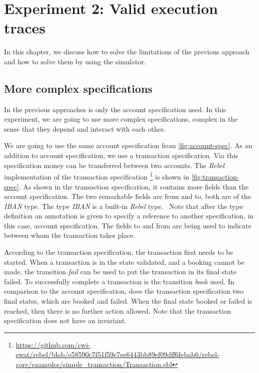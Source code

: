 \chapter{Experiment 2: Valid execution traces}\label{sec:ch5}

In this chapter, we discuss how to solve the limitations of the previous
approach and how to solve them by using the simulator.

\section{More complex specifications}\label{sec:ch5-complex-spec}
In the previous approaches is only the account specification used. In this
experiment, we are going to use more complex specifications, complex in the
sense that they depend and interact with each other.

We are going to use the
same account specification from \autoref{fig:account-spec}. As an addition to
account specification, we use a transaction specification. Via this
specification money can be transferred between two accounts.
The \textit{Rebel} implementation of the transaction specification \footnote{\url{https://github.com/cwi-swat/rebel/blob/e58590c7f51f59e7ee6443bb89ef09dff6febab6/rebel-core/examples/simple_transaction/Transaction.ebl}} is shown in \autoref{fig:transaction-spec}.
As shown in the transaction specification, it contains more fields than the
account specification. The two remarkable fields are from and to, both are of
the \textit{IBAN} type. The type \textit{IBAN} is a built-in \textit{Rebel}
type.~\cite[p.~3]{stoel_storm_vinju_bosman_2016} Note that after the type
definition an annotation is given to specify a reference to another
specification, in this case, account specification. The fields to and from are
being used to indicate between whom the transaction takes place.

According to the transaction specification, the transaction first
needs to be started. When a transaction is in the state validated, and a booking
cannot be made, the transition \textit{fail} can be used to put the transaction in its
final state failed. To successfully complete a transaction is the transition
\textit{book} used. In comparison to the account specification, does the transaction
specification two final states, which are booked and failed. When the final
state booked or failed is reached, then there is no further action allowed.
Note that the transaction specification does not have an invariant.


